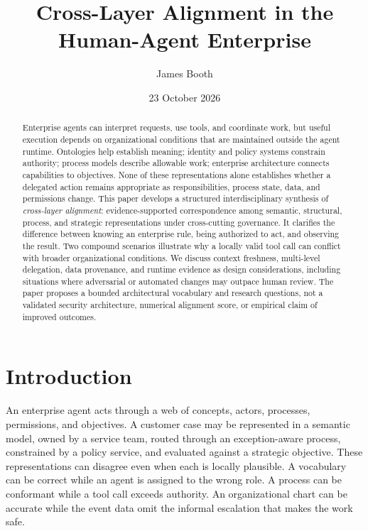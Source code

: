 \documentclass[11pt,letterpaper]{article}
\title{Cross-Layer Alignment in the Human-Agent Enterprise}
\author{James Booth}
\date{23 October 2026}
\begin{document}
\maketitle

\begin{abstract}
Enterprise agents can interpret requests, use tools, and coordinate work, but useful execution depends on organizational conditions that are maintained outside the agent runtime. Ontologies help establish meaning; identity and policy systems constrain authority; process models describe allowable work; enterprise architecture connects capabilities to objectives. None of these representations alone establishes whether a delegated action remains appropriate as responsibilities, process state, data, and permissions change. This paper develops a structured interdisciplinary synthesis of \emph{cross-layer alignment}: evidence-supported correspondence among semantic, structural, process, and strategic representations under cross-cutting governance. It clarifies the difference between knowing an enterprise rule, being authorized to act, and observing the result. Two compound scenarios illustrate why a locally valid tool call can conflict with broader organizational conditions. We discuss context freshness, multi-level delegation, data provenance, and runtime evidence as design considerations, including situations where adversarial or automated changes may outpace human review. The paper proposes a bounded architectural vocabulary and research questions, not a validated security architecture, numerical alignment score, or empirical claim of improved outcomes.
\end{abstract}

\section{Introduction}
An enterprise agent acts through a web of concepts, actors, processes, permissions, and objectives. A customer case may be represented in a semantic model, owned by a service team, routed through an exception-aware process, constrained by a policy service, and evaluated against a strategic objective. These representations can disagree even when each is locally plausible. A vocabulary can be correct while an agent is assigned to the wrong role. A process can be conformant while a tool call exceeds authority. An organizational chart can be accurate while the event data omit the informal escalation that makes the work safe.
\end{document}
